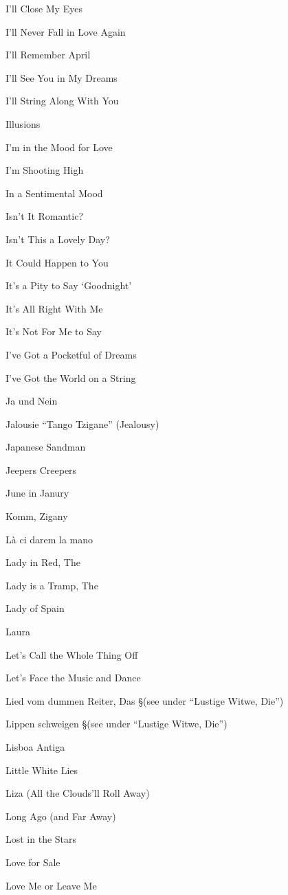 \N I'll Close My Eyes

\N I'll Never Fall in Love Again

\N I'll Remember April

\N I'll See You in My Dreams

\N I'll String Along With You

\N Illusions

\N I'm in the Mood for Love

\N I'm Shooting High

\N In a Sentimental Mood

\N Isn't It Romantic?

\N Isn't This a Lovely Day?

\N It Could Happen to You

\N It's a Pity to Say `Goodnight'

\N It's All Right With Me

\N It's Not For Me to Say

\N I've Got a Pocketful of Dreams

\N I've Got the World on a String

\N Ja und Nein

\N Jalousie ``Tango Tzigane'' (Jealousy)

\N Japanese Sandman

\N Jeepers Creepers

\N June in Janury

\N Komm, Zigany

\N L{\`a} ci darem la mano

\N Lady in Red, The

\N Lady is a Tramp, The

\N Lady of Spain

\N Laura

\N Let's Call the Whole Thing Off

\N Let's Face the Music and Dance

\N Lied vom dummen Reiter, Das
\nobreak
\S (see under ``Lustige Witwe, Die'')

\N Lippen schweigen
\nobreak
\S (see under ``Lustige Witwe, Die'')

\N Lisboa Antiga

\N Little White Lies

\N Liza (All the Clouds'll Roll Away)

\N Long Ago (and Far Away)

\N Lost in the Stars

\N Love for Sale

\N Love Me or Leave Me

